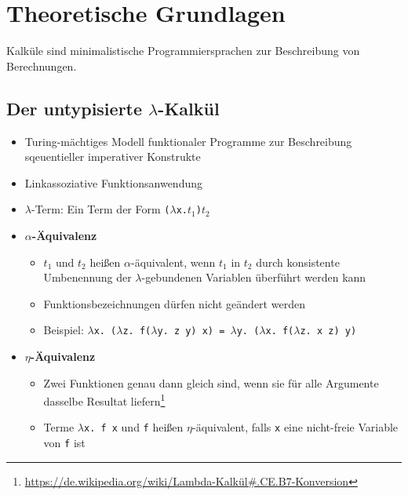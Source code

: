 \section{Theoretische Grundlagen}
Kalküle sind minimalistische Programmiersprachen zur Beschreibung von Berechnungen.	

\subsection{Der untypisierte $\lambda$-Kalkül}
\begin{itemize}
	\item Turing-mächtiges Modell funktionaler Programme zur Beschreibung sqeuentieller imperativer Konstrukte
	\item Linkassoziative Funktionsanwendung
	\item \(\lambda\)-Term: Ein Term der Form \texttt{(\(\lambda\)x.\(t_1\))\(t_2\)}
	\item \textbf{\(\alpha\)-Äquivalenz}
	\begin{itemize}
		\item \(t_1\) und \(t_2\) heißen \(\alpha\)-äquivalent, wenn \(t_1\) in \(t_2\) durch konsistente Umbenennung der \(\lambda\)-gebundenen Variablen überführt werden kann
		\item Funktionsbezeichnungen dürfen nicht geändert werden
		\item Beispiel: \texttt{\(\lambda\)x. (\(\lambda\)z. f(\(\lambda\)y. z y) x) = \(\lambda\)y. (\(\lambda\)x. f(\(\lambda\)z. x z) y)}
	\end{itemize}
	\item \textbf{\(\eta\)-Äquivalenz}
	\begin{itemize}
		\item Zwei Funktionen genau dann gleich sind, wenn sie für alle Argumente dasselbe Resultat liefern\footnote{\url{https://de.wikipedia.org/wiki/Lambda-Kalkül\#.CE.B7-Konversion}}
		\item Terme \texttt{\(\lambda\)x. f x} und \texttt{f} heißen \(\eta\)-äquivalent, falls \texttt{x} eine nicht-freie Variable von \texttt{f} ist
	\end{itemize}
\end{itemize}

